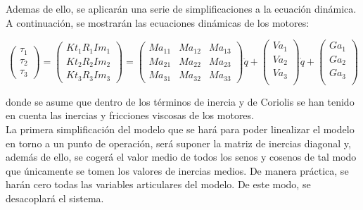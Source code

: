 Ademas de ello, se aplicarán una serie de simplificaciones a la ecuación dinámica. A continuación, se mostrarán las ecuaciones dinámicas de los motores:\\

\begin{center}
	$$	
	\begin{pmatrix}
		
		\tau_{1} \\
		
		\tau_{2} \\
		
		\tau_ {3}
	\end{pmatrix}=
	\begin{pmatrix}		
		Kt_{1}R_{1}Im_{1}  \\
		
		Kt_{2}R_{2}Im_{2}  \\
		
		Kt_{3}R_{3}Im_{3}		
	\end{pmatrix} =
	\begin{pmatrix}
		Ma_{11} & Ma_{12} & Ma_{13}  \\
		
		Ma_{21} & Ma_{22} & Ma_{23}  \\
		
		Ma_{31} & Ma_{32} & Ma_{33}
	\end{pmatrix}	
	\ddot{q}+	
	\begin{pmatrix}		
		Va_{1} \\
		
		Va_{2} \\
		
		Va_{3} \\		
	\end{pmatrix}
	\dot{q}+	
	\begin{pmatrix}		
		Ga_{1}  \\
		
		Ga_{2}  \\
		
		Ga_{3}\\		
	\end{pmatrix}	
	$$	
\end{center}

donde se asume que dentro de los términos de inercia y de Coriolis se han tenido en cuenta las inercias y fricciones viscosas de los motores.\\



La primera simplificación del modelo que se hará para poder linealizar el modelo en torno a un punto de operación, será suponer la matriz de inercias diagonal y, además de ello, se cogerá el valor medio de todos los senos y cosenos de tal modo que únicamente se tomen los valores de inercias medios. De manera práctica, se harán cero todas las variables articulares del modelo. De este modo, se desacoplará el sistema.\\


